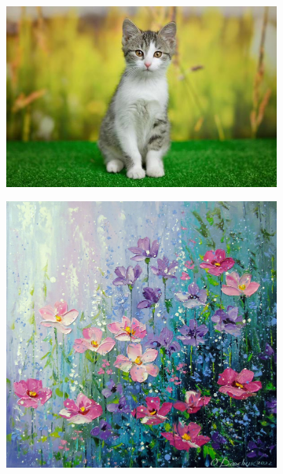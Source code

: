 \documentclass[a4paper,12pt]{article}
\begin{document}
\begin{figure}[H]

\begin{subfigure}{0.4\textwidth}

    \includegraphics[width=\linewidth]{cat.jpg}
\end{subfigure}
\hfill
\begin{subfigure}{0.3\textwidth}
   
    \includegraphics[width=\linewidth]{cat_style.jpg}
\end{subfigure}


\end{figure}
\end{document}

